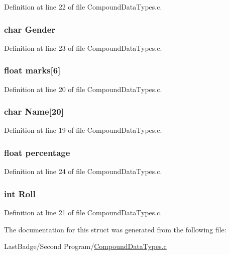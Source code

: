Definition at line 22 of file Compound\+Data\+Types.\+c.

\hypertarget{structmember_afbcfc79081bb5d32e3e787e11b880fda}{
\subsubsection[{Gender}]{\setlength{\rightskip}{0pt plus 5cm}char Gender}}\label{structmember_afbcfc79081bb5d32e3e787e11b880fda}


Definition at line 23 of file Compound\+Data\+Types.\+c.

\hypertarget{structmember_ad4c3e5c25307fd49af034db07064803a}{
\subsubsection[{marks}]{\setlength{\rightskip}{0pt plus 5cm}float marks\mbox{[}6\mbox{]}}}\label{structmember_ad4c3e5c25307fd49af034db07064803a}


Definition at line 20 of file Compound\+Data\+Types.\+c.

\hypertarget{structmember_a2053e4d21d9f2f5158910a2977224749}{
\subsubsection[{Name}]{\setlength{\rightskip}{0pt plus 5cm}char Name\mbox{[}20\mbox{]}}}\label{structmember_a2053e4d21d9f2f5158910a2977224749}


Definition at line 19 of file Compound\+Data\+Types.\+c.

\hypertarget{structmember_a34c5b668208550b3c34a2ed0eec615f5}{
\subsubsection[{percentage}]{\setlength{\rightskip}{0pt plus 5cm}float percentage}}\label{structmember_a34c5b668208550b3c34a2ed0eec615f5}


Definition at line 24 of file Compound\+Data\+Types.\+c.

\hypertarget{structmember_abf08303c7c1c86949317530985b66f65}{
\subsubsection[{Roll}]{\setlength{\rightskip}{0pt plus 5cm}int Roll}}\label{structmember_abf08303c7c1c86949317530985b66f65}


Definition at line 21 of file Compound\+Data\+Types.\+c.



The documentation for this struct was generated from the following file\+:\begin{DoxyCompactItemize}
\item 
Last\+Badge/\+Second Program/\hyperlink{_compound_data_types_8c}{Compound\+Data\+Types.\+c}\end{DoxyCompactItemize}
